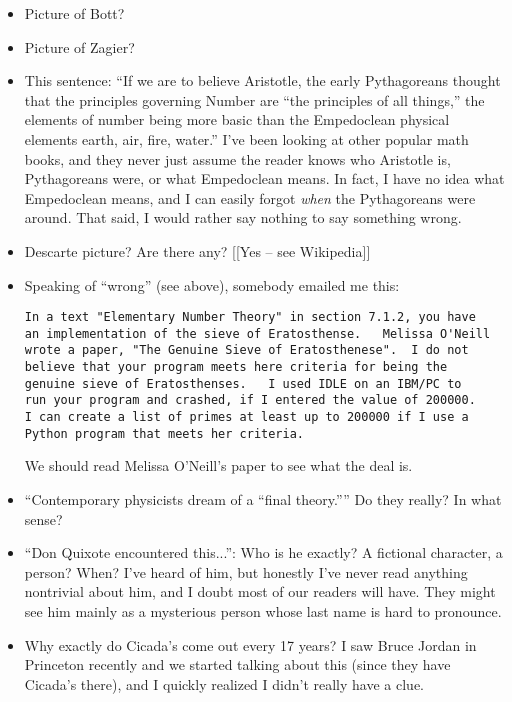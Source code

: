 \documentclass{article}
\begin{document}
\begin{itemize}
\item Picture of Bott?

\item Picture of Zagier?

\item This sentence: ``If we are to believe Aristotle, the early
  Pythagoreans thought that the principles governing Number are “the
  principles of all things,” the elements of number being more basic
  than the Empedoclean physical elements earth, air, fire, water.''
  I've been looking at other popular math books, and they never just
  assume the reader knows who Aristotle is, Pythagoreans were, or what
  Empedoclean means.  In fact, I have no idea what Empedoclean means,
  and I can easily forgot {\em when} the Pythagoreans were around. 
That said, I would rather say nothing to say something wrong. 
  
\item Descarte picture?  Are there any?  [[Yes -- see Wikipedia]]

\item Speaking of ``wrong'' (see above), somebody emailed me this:
\begin{verbatim}
In a text "Elementary Number Theory" in section 7.1.2, you have
an implementation of the sieve of Eratosthense.   Melissa O'Neill
wrote a paper, "The Genuine Sieve of Eratosthenese".  I do not
believe that your program meets here criteria for being the
genuine sieve of Eratosthenses.   I used IDLE on an IBM/PC to
run your program and crashed, if I entered the value of 200000.
I can create a list of primes at least up to 200000 if I use a
Python program that meets her criteria.
\end{verbatim}
We should read   Melissa O'Neill's paper to see what the deal is.

\item ``Contemporary physicists dream of a “final theory.”'' Do they
  really?  In what sense?

\item ``Don Quixote encountered this...'': Who is he exactly?  A
  fictional character, a person?  When?  I've heard of him, but
  honestly I've never read anything nontrivial about him, and I doubt
  most of our readers will have.  They might see him mainly as a
  mysterious person whose last name is hard to pronounce.

\item Why exactly do Cicada's come out every 17 years?  I saw Bruce
  Jordan in Princeton recently and we started talking about this
  (since they have Cicada's there), and I quickly realized I didn't
  really have a clue.


\end{itemize}
\end{document}
